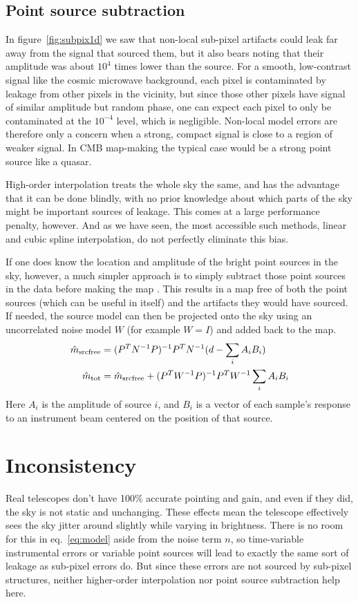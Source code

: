 \documentclass{article}
\begin{document}
\subsection{Point source subtraction}
In figure~\ref{fig:subpix1d} we saw that non-local sub-pixel artifacts could leak far away from the
signal that sourced them, but it also bears noting that their amplitude was about
$10^4$ times lower than the source. For a smooth, low-contrast signal like the
cosmic microwave background, each pixel is contaminated by leakage from
other pixels in the vicinity, but since those other pixels have signal of similar
amplitude but random phase, one can expect each pixel to only be contaminated at the
$10^{-4}$ level, which is negligible. Non-local model errors are therefore only
a concern when a strong, compact signal is close to a region of weaker signal. In
CMB map-making the typical case would be a strong point source like a quasar.

High-order interpolation treats the whole sky the same, and has the advantage that it
can be done blindly, with no prior knowledge about which parts of the sky might
be important sources of leakage. This comes at a large performance
penalty, however. And as we have seen, the most accessible such methods, linear and cubic spline
interpolation, do not perfectly eliminate this bias.

If one does know the location
and amplitude of the bright point sources in the sky, however, a much simpler approach
is to simply subtract those point sources in the data before making the map
\citep{dunner/etal/2013}. This
results in a map free of both the point sources (which can be useful in itself)
and the artifacts they would have sourced. If needed, the source model can then be
projected onto the sky using an uncorrelated noise model $W$ (for example $W=I$)
and added back to the map.
\begin{align}
\hat m_\textrm{srcfree} &= (P^TN^{-1}P)^{-1}P^TN^{-1}(d - \sum_i A_i B_i) \notag \\
\hat m_\textrm{tot} &= \hat m_\textrm{srcfree} + (P^TW^{-1}P)^{-1}P^T W^{-1}\sum_i A_i B_i
\end{align}
Here $A_i$ is the amplitude of source $i$, and $B_i$ is a vector of each sample's
response to an instrument beam centered on the position of that source.

\section{Inconsistency}
\label{sect:inconsistency}
Real telescopes don't have 100\% accurate pointing and gain, and even if they did, the
sky is not static and unchanging. These effects mean the telescope effectively sees the
sky jitter around slightly while varying in brightness. There is no room for this in
eq.~\ref{eq:model} aside from the noise term $n$, so time-variable instrumental errors
or variable point sources will
lead to exactly the same sort of leakage as
sub-pixel errors do. But since these errors are not sourced by sub-pixel structures,
neither higher-order interpolation nor point source subtraction help here.
\end{document}
